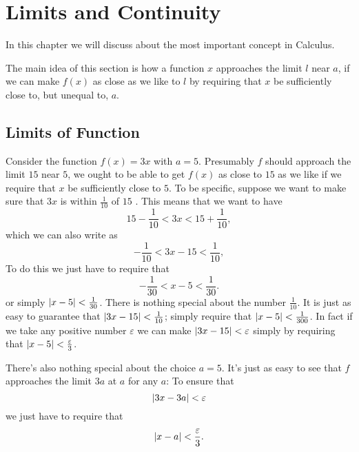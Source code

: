 \section{Limits and Continuity}
In this chapter we will discuss about the most important concept in Calculus.

The main idea of this section is how a function $x$ approaches the limit $l$
near $a$, if we can make $f(x)$ as close as we like to $l$ by requiring that $x$ be
sufficiently close to, but unequal to, $a$.

\subsection{Limits of Function}
\begin{eg}
     Consider the function $f(x) =3x$ with $a=5$. Presumably $f$ should approach
     the limit $15$ near $5$, we ought to be able to get $f(x)$ as close to $15$
     as we like if we require that $x$ be sufficiently close to $5$. To be specific,
     suppose we want to make sure that $3x$ is within $\tfrac{1}{10}$ of $15$ . This means that we
     want to have 
     \begin{equation*}
         15-\dfrac{1}{10} < 3x < 15+\dfrac{1}{10},
     \end{equation*}
     which we can also write as 
     \begin{equation*}
         -\dfrac{1}{10} < 3x-15 <\dfrac{1}{10},
     \end{equation*}
     To do this we just have to require that
     \begin{equation*}
         -\dfrac{1}{30} < x-5 < \dfrac{1}{30}.
     \end{equation*}
     or simply $\left\lvert x-5\right\rvert<\tfrac{1}{30}$. There is nothing special about the
     number $\tfrac{1}{10}$. It is just as easy to guarantee that $\left\lvert 3x-15\right\rvert<
     \tfrac{1}{10}$; simply require that $\left\lvert x-5\right\rvert < \tfrac{1}{300}$. In fact
     if we take any positive number $\varepsilon$ we can make $\left\lvert 3x-15\right\rvert <
     \varepsilon$ simply by requiring that $\left\lvert x-5\right\rvert<\tfrac{\varepsilon}{3}$. 

     There's also nothing special about the choice $a = 5$. It's just as easy to
    see that $f$ approaches the limit $3a$ at $a$ for any $a$: To ensure that
    \begin{equation*}
        \left\lvert 3x-3a\right\rvert< \varepsilon
    \end{equation*}
    we just have to require that 
    \begin{equation*}
        \left\lvert x-a\right\rvert<\dfrac{\varepsilon}{3}.
    \end{equation*}
\end{eg}

